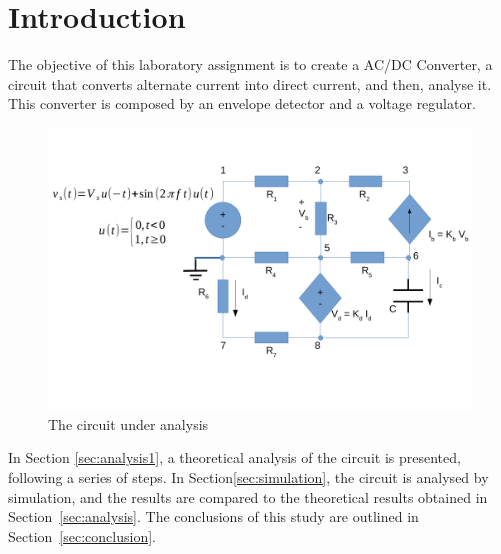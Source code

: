 \section{Introduction}
\label{sec:introduction}

The objective of this laboratory assignment is to create a AC/DC Converter, a circuit that converts alternate current into direct current, and then, analyse it. This converter is composed by an envelope detector and a voltage regulator.

\begin{figure}[h] \centering
\includegraphics[width=0.8\linewidth]{rc.pdf}
\caption{The circuit under analysis}
\label{fig:rc}
\end{figure}

In Section \ref{sec:analysis1}, a theoretical analysis of the circuit is
presented, following a series of steps. In Section\ref{sec:simulation}, the circuit is analysed by
simulation, and the results are compared to the theoretical results obtained in
Section~\ref{sec:analysis}. The conclusions of this study are outlined in
Section~\ref{sec:conclusion}.





